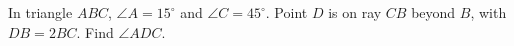 In triangle $ABC$, $\angle A=15^\circ$ and $\angle C=45^\circ$. Point $D$ is on ray $CB$ beyond $B$, with $DB=2BC$. Find $\angle ADC$.
